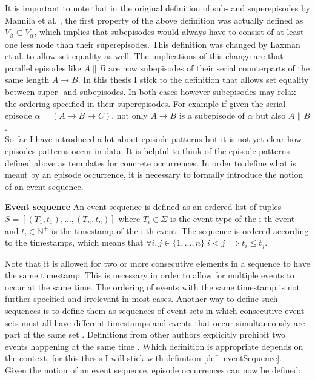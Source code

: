 It is important to note that in the original definition of sub- and superepisodes by Mannila et al. \cite{mannila1995discovering}, the first property of the above definition was actually defined as $V_\beta \subset V_\alpha$, which implies that subepisodes would always have to consist of at least one less node than their superepisodes. This definition was changed by Laxman et al. \cite{laxman2007fast} to allow set equality as well. The implications of this change are that parallel episodes like $A \| B$ are now subepisodes of their serial counterparts of the same length $A \rightarrow B$. In this thesis I stick to the definition that allows set equality between super- and subepisodes. In both cases however subepisodes may relax the ordering specified in their superepisodes. For example if given the serial episode $\alpha =( A \rightarrow B \rightarrow C )$, not only $A \rightarrow B$ is a subepisode of $\alpha$ but also $A \| B$. \\
So far I have introduced a lot about episode patterns but it is not yet clear how episodes patterns occur in data. It is helpful to think of the episode patterns defined above as templates for concrete occurrences. In order to define what is meant by an episode occurrence, it is necessary to formally introduce the notion of an event sequence.

\begin{mydef}
\label{def_eventSequence}
\textbf{Event sequence} An event sequence is defined as an ordered list of tuples $S = [ (T_1,t_1),..., (T_n,t_n) ] $ where $T_i \in \Sigma$ is the event type of the i-th event and $t_i \in \mathbb{N}^+$ is the timestamp of the i-th event. The sequence is ordered according to the timestamps, which means that $\forall i,j \in \{1,...,n\} \; i<j \implies t_i \leq t_j$. \cite{mannila1997discovery} 
\end{mydef}

Note that it is allowed for two or more consecutive elements in a sequence to have the same timestamp. This is necessary in order to allow for multiple events to occur at the same time. The ordering of events with the same timestamp is not further specified and irrelevant in most cases. Another way to define such sequences is to define them as sequences of event sets in which consecutive event sets must all have different timestamps and events that occur simultaneously are part of the same set \cite{bathoorn2007finding}. Definitions from other authors explicitly prohibit two events happening at the same time \cite{baumgarten2003tree}. Which definition is appropriate depends on the context, for this thesis I will stick with definition \ref{def_eventSequence}. \\
Given the notion of an event sequence, episode occurrences can now be defined:

